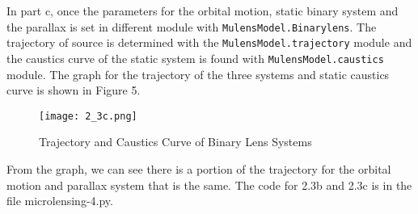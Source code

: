 \documentclass[preprint]{aastex63}
\begin{document}
\bigskip
In part c, once the parameters for the orbital motion, static binary system and the parallax is set in different module with \texttt{MulensModel.Binarylens}. The trajectory of source is determined with the \texttt{MulensModel.trajectory} module and the caustics curve of the static system is found with \texttt{MulensModel.caustics} module. The graph for the trajectory of the three systems and static caustics curve is shown in Figure 5. \par
\begin{figure}[h]
\centering
\texttt{[image: 2\_3c.png]}
\caption{Trajectory and Caustics Curve of Binary Lens Systems}
\label{fig 5}
\end{figure}

From the graph, we can see there is a portion of the trajectory for the orbital motion and parallax system that is the same. The code for 2.3b and 2.3c is in the file microlensing-4.py.
\clearpage


\end{document}
